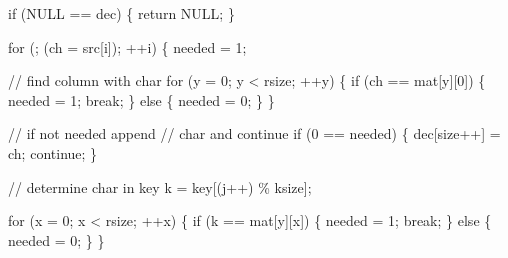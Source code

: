 \documentclass[
  a4paper,
]{scrreprt}
\newenvironment{Shaded}{\begin{snugshade}}{\end{snugshade}}
\newcommand{\CommentTok}[1]{\textcolor[rgb]{0.41,0.41,0.41}{#1}}
\newcommand{\ControlFlowTok}[1]{\textcolor[rgb]{0.85,0.12,0.09}{#1}}
\newcommand{\DecValTok}[1]{\textcolor[rgb]{0.47,0.16,0.63}{#1}}
\newcommand{\NormalTok}[1]{\textcolor[rgb]{0.33,0.33,0.33}{#1}}
\newcommand{\OperatorTok}[1]{\textcolor[rgb]{0.00,0.46,0.62}{#1}}
\theoremstyle{definition}
\theoremstyle{remark}
\begin{document}
\begin{Shaded}
\begin{Highlighting}[numbers=left,,]
  \ControlFlowTok{if} \OperatorTok{(}\NormalTok{NULL }\OperatorTok{==}\NormalTok{ dec}\OperatorTok{)} \OperatorTok{\{} \ControlFlowTok{return}\NormalTok{ NULL}\OperatorTok{;} \OperatorTok{\}}

  \ControlFlowTok{for} \OperatorTok{(;} \OperatorTok{(}\NormalTok{ch }\OperatorTok{=}\NormalTok{ src}\OperatorTok{[}\NormalTok{i}\OperatorTok{]);} \OperatorTok{++}\NormalTok{i}\OperatorTok{)} \OperatorTok{\{}
\NormalTok{    needed }\OperatorTok{=} \DecValTok{1}\OperatorTok{;}

    \CommentTok{// find column with char}
    \ControlFlowTok{for} \OperatorTok{(}\NormalTok{y }\OperatorTok{=} \DecValTok{0}\OperatorTok{;}\NormalTok{ y }\OperatorTok{\textless{}}\NormalTok{ rsize}\OperatorTok{;} \OperatorTok{++}\NormalTok{y}\OperatorTok{)} \OperatorTok{\{}
      \ControlFlowTok{if} \OperatorTok{(}\NormalTok{ch }\OperatorTok{==}\NormalTok{ mat}\OperatorTok{[}\NormalTok{y}\OperatorTok{][}\DecValTok{0}\OperatorTok{])} \OperatorTok{\{}\NormalTok{ needed }\OperatorTok{=} \DecValTok{1}\OperatorTok{;} \ControlFlowTok{break}\OperatorTok{;} \OperatorTok{\}}
      \ControlFlowTok{else} \OperatorTok{\{}\NormalTok{ needed }\OperatorTok{=} \DecValTok{0}\OperatorTok{;} \OperatorTok{\}}
    \OperatorTok{\}}

    \CommentTok{// if not needed append}
    \CommentTok{// char and continue}
    \ControlFlowTok{if} \OperatorTok{(}\DecValTok{0} \OperatorTok{==}\NormalTok{ needed}\OperatorTok{)} \OperatorTok{\{}
\NormalTok{      dec}\OperatorTok{[}\NormalTok{size}\OperatorTok{++]} \OperatorTok{=}\NormalTok{ ch}\OperatorTok{;}
      \ControlFlowTok{continue}\OperatorTok{;}
    \OperatorTok{\}}

    \CommentTok{// determine char in \textasciigrave{}key\textquotesingle{}}
\NormalTok{    k }\OperatorTok{=}\NormalTok{ key}\OperatorTok{[(}\NormalTok{j}\OperatorTok{++)} \OperatorTok{\%}\NormalTok{ ksize}\OperatorTok{];}

    \ControlFlowTok{for} \OperatorTok{(}\NormalTok{x }\OperatorTok{=} \DecValTok{0}\OperatorTok{;}\NormalTok{ x }\OperatorTok{\textless{}}\NormalTok{ rsize}\OperatorTok{;} \OperatorTok{++}\NormalTok{x}\OperatorTok{)}  \OperatorTok{\{}
      \ControlFlowTok{if} \OperatorTok{(}\NormalTok{k }\OperatorTok{==}\NormalTok{ mat}\OperatorTok{[}\NormalTok{y}\OperatorTok{][}\NormalTok{x}\OperatorTok{])} \OperatorTok{\{}\NormalTok{ needed }\OperatorTok{=} \DecValTok{1}\OperatorTok{;} \ControlFlowTok{break}\OperatorTok{;} \OperatorTok{\}}
      \ControlFlowTok{else} \OperatorTok{\{}\NormalTok{ needed }\OperatorTok{=} \DecValTok{0}\OperatorTok{;} \OperatorTok{\}}
    \OperatorTok{\}}


\end{Highlighting}
\end{Shaded}
\end{document}
